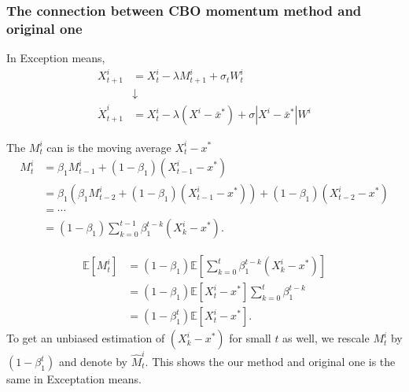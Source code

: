 \documentclass{beamer}
\begin{document}
	\begin{frame}
	\frametitle{The connection between CBO momentum method and original one}
	In Exception means,
	\begin{equation}
		\begin{aligned}
			X^i_{t+1} &= X_t^i - \lambda M^i_{t+1} + \sigma_t W^i_t \\
			&\downarrow\\
			\dot X^i_{t+1} &= X_t^i  -\lambda (X^i - \bar{x}^*) +\sigma |X^i-\bar{x}^*|  W^i
		\end{aligned}
	\end{equation}
	
	
The $M_t^i$ can is the moving average $X_{t}^i - x^*$
\begin{equation*}
	\begin{aligned}
		M^i_t & = \beta_1 M^i_{t-1} + (1-\beta_1)(X^i_{t-1} - x^*)\\
		& = \beta_1 (\beta_1 M^i_{t-2} + (1-\beta_1) (X_{t-1}^i - x^*)) + (1-\beta_1) (X^i_{t-2} - x^*)\\
		& = \cdots \\
		& = (1-\beta_1) \sum_{k=0}^{t-1} \beta_1^{t-k} (X_{k}^i - x^*).
	\end{aligned}
\end{equation*}
\end{frame}
\begin{frame}
	\begin{equation*}
	\begin{aligned}
		\mathbb{E} [M^i_t] & =(1-\beta_1)   \mathbb{E} [\sum_{k=0}^t \beta_1^{t-k} (X_{k}^i - x^*)] \\
		&= (1-\beta_1) \mathbb{E}[ X_{t}^i - x^* ]  \sum_{k=0}^t \beta_1^{t-k} \\
		&= (1-\beta_1^t)  \mathbb{E}[ X_{t}^i - x^* ].
	\end{aligned}
\end{equation*}
To get an unbiased estimation of $ (X_{k}^i - x^*)$ for small $t$ as well, we rescale $M^i_t$ by $(1-\beta_1^t)$ and denote by $\hat{M}^i_t$. This shows the our method and original one is the same in Exceptation means.
\end{frame}
\end{document}
